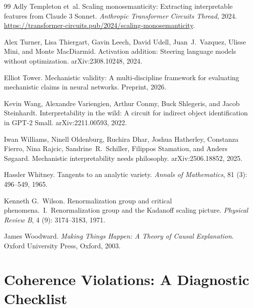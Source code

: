 \documentclass[11pt]{article}
\theoremstyle{remark}
\begin{document}
\begin{thebibliography}{99}
Adly Templeton et~al.
\newblock Scaling monosemanticity: Extracting interpretable features from
  {Claude 3 Sonnet}.
\newblock \emph{Anthropic Transformer Circuits Thread}, 2024.
\newblock \url{https://transformer-circuits.pub/2024/scaling-monosemanticity}.

Alex Turner, Lisa Thiergart, Gavin Leech, David Udell, Juan~J.\ Vazquez,
  Ulisse Mini, and Monte MacDiarmid.
\newblock Activation addition: Steering language models without optimization.
\newblock arXiv:2308.10248, 2024.

Elliot Tower.
\newblock Mechanistic validity: A multi-discipline framework for evaluating
  mechanistic claims in neural networks.
\newblock Preprint, 2026.

Kevin Wang, Alexandre Variengien, Arthur Conmy, Buck Shlegeris, and Jacob
  Steinhardt.
\newblock Interpretability in the wild: A circuit for indirect object
  identification in {GPT-2 Small}.
\newblock arXiv:2211.00593, 2022.

Iwan Williams, Ninell Oldenburg, Ruchira Dhar, Joshua Hatherley, Constanza
  Fierro, Nina Rajcic, Sandrine~R.\ Schiller, Filippos Stamatiou, and Anders
  S{\o}gaard.
\newblock Mechanistic interpretability needs philosophy.
\newblock arXiv:2506.18852, 2025.

Hassler Whitney.
\newblock Tangents to an analytic variety.
\newblock \emph{Annals of Mathematics}, 81 (3): 496--549, 1965.

Kenneth G.\ Wilson.
\newblock Renormalization group and critical phenomena.\ {I}.\ Renormalization
  group and the {Kadanoff} scaling picture.
\newblock \emph{Physical Review B}, 4 (9): 3174--3183, 1971.

James Woodward.
\newblock \emph{Making Things Happen: A Theory of Causal Explanation}.
\newblock Oxford University Press, Oxford, 2003.

\end{thebibliography}

\newpage
\appendix
\section{Coherence Violations: A Diagnostic Checklist}\label{app:checklist}
\end{document}

